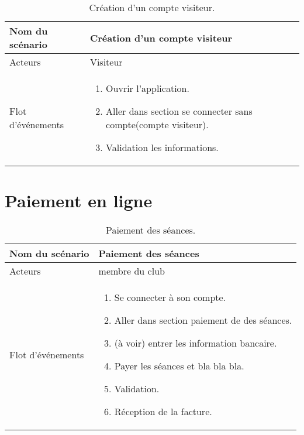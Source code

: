 \documentclass{report}
\begin{document}
\begin{table}[htbp]
\begin{center}
\begin{tabular}{|L{4cm}||L{10cm}|}
\hline Nom du scénario & Création d'un compte visiteur  \\
\hline  Acteurs &  Visiteur \\
\hline  Flot d'événements &  \begin{enumerate}
\item Ouvrir l'application.
\item Aller dans section se connecter sans compte(compte visiteur).
\item Validation les informations.
\end{enumerate} \\
\hline
\end{tabular}
\caption{Création d'un compte visiteur.\label{creavisit}}
\end{center}
\end{table}

\section{Paiement en ligne}
\begin{table}[htbp]
\begin{center}
\begin{tabular}{|L{4cm}||L{10cm}|}
\hline Nom du scénario & Paiement des séances \\
\hline  Acteurs &  membre du club \\
\hline  Flot d'événements &  \begin{enumerate}
\item Se connecter à son compte.
\item Aller dans section paiement de des séances.
\item (à voir) entrer les information bancaire.
\item Payer les séances et bla bla bla.
\item Validation.
\item Réception de la facture.
\end{enumerate} \\
\hline
\end{tabular}
\caption{Paiement des séances.\label{paiement}}
\end{center}
\end{table}
\end{document}

